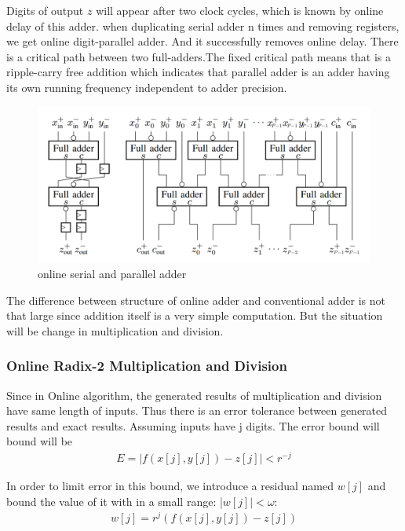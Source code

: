 \documentclass[10pt]{article}
\begin{document}
Digits of output $z$ will appear after two clock cycles, which is known by online delay of this adder. when duplicating serial adder n times and removing registers, we get online digit-parallel adder. And it successfully removes online delay. There is a critical path between two full-adders\cite{c5}.The fixed critical path means that is a ripple-carry free addition which indicates that parallel adder is an adder having  its own running frequency independent to adder precision\cite{c6}.
         \begin{figure}[H]
       \centering
       \includegraphics[scale=0.35]{f2.png}
       \caption{online serial and parallel adder}
    \end{figure}
    
The difference between structure of online adder and conventional adder is not that large since addition itself is a very simple computation. But the situation will be change in multiplication and division.
    
\subsubsection{Online Radix-2 Multiplication and Division}

Since in Online algorithm, the generated results of multiplication and division have same length of inputs. Thus there is an error tolerance between generated results and exact results. Assuming inputs have j digits. The error bound will bound will be 
\begin{gather}
    E = |f(x[j],y[j])-z[j]| < r^{-j}
\end{gather}

In order to limit error in this bound, we introduce a residual named $w[j]$ and bound the value of it with in a small range: |$w[j]|< \omega$:
\begin{gather}
    w[j] = r^j(f(x[j],y[j])-z[j])
\end{gather}
\end{document}
